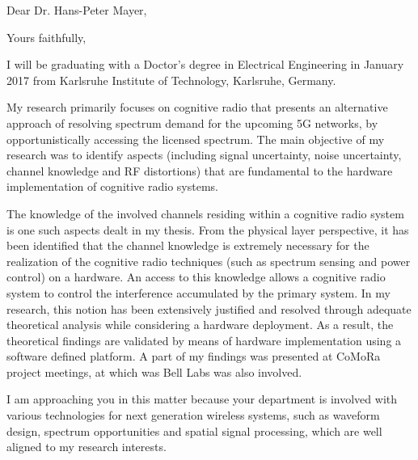 \documentclass[11pt,a4paper,sans]{moderncv}        %
\begin{document}
\date{\today}
\opening{Dear Dr. Hans-Peter Mayer,}
\closing{Yours faithfully,}
\makelettertitle
I will be graduating with a Doctor's degree in Electrical Engineering in January 2017 from Karlsruhe Institute of Technology, Karlsruhe, Germany. 

My research primarily focuses on cognitive radio that presents an alternative approach of resolving spectrum demand for the upcoming 5G networks, by opportunistically accessing the licensed spectrum. The main objective of my research was to identify aspects (including signal uncertainty, noise uncertainty, channel knowledge and RF distortions) that are fundamental to the hardware implementation of cognitive radio systems. 

The knowledge of the involved channels residing within a cognitive radio system is one such aspects dealt in my thesis. From the physical layer perspective, it has been identified that the channel knowledge is extremely necessary for the realization of the cognitive radio techniques (such as spectrum sensing and power control) on a hardware. An access to this knowledge allows a cognitive radio system to control the interference accumulated by the primary system. In my research, this notion has been extensively justified and resolved through adequate theoretical analysis while considering a hardware deployment. As a result, the theoretical findings are validated by means of hardware implementation using a software defined platform. A part of my findings was presented at CoMoRa project meetings, at which was Bell Labs was also involved.   

I am approaching you in this matter because your department is involved with various technologies for next generation wireless systems, such as waveform design, spectrum opportunities and spatial signal processing, which are well aligned to my research interests. 
\end{document}
